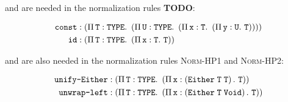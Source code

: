  and  are needed in the normalization rules \textbf{TODO}:

\begin{align}
	\texttt{const} & : \left(\Pi\,\mathit{\texttt{T}}:\texttt{TYPE}.\ \left(\Pi\,\mathit{\texttt{U}}:\texttt{TYPE}.\ \left(\Pi\,\mathit{\texttt{x}}:\texttt{T}.\ \left(\Pi\,\mathit{\texttt{y}}:\texttt{U}.\ \texttt{T}\right)\right)\right)\right) \\
	\texttt{id} & : \left(\Pi\,\mathit{\texttt{T}}:\texttt{TYPE}.\ \left(\Pi\,\mathit{\texttt{x}}:\texttt{T}.\ \texttt{T}\right)\right)
\end{align}

 and  are also needed in the normalization rules \textsc{Norm-HP1} and \textsc{Norm-HP2}:

\begin{align}
	\texttt{unify-Either} & : \left(\Pi\,\mathit{\texttt{T}}:\texttt{TYPE}.\ \left(\Pi\,\mathit{\texttt{x}}:\left(\texttt{\texttt{Either}}\;\texttt{T}\;\texttt{T}\right).\ \texttt{T}\right)\right) \\
	\texttt{unwrap-left} & : \left(\Pi\,\mathit{\texttt{T}}:\texttt{TYPE}.\ \left(\Pi\,\mathit{\texttt{x}}:\left(\texttt{\texttt{Either}}\;\texttt{T}\;\texttt{Void}\right).\ \texttt{T}\right)\right) \\
\end{align}
